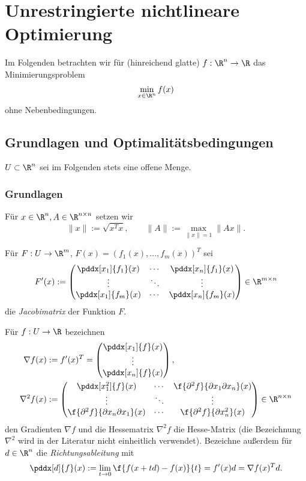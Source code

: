 \chapter{Unrestringierte nichtlineare Optimierung}


Im Folgenden betrachten wir für (hinreichend glatte) $f: \R^n \to \R$ das Minimierungsproblem
\[
	\min_{x\in \R^n} f(x)
\]
ohne Nebenbedingungen.


\section{Grundlagen und Optimalitätsbedingungen}


$U \subset \R^n$ sei im Folgenden stets eine offene Menge.


\subsection{Grundlagen}

Für $x \in \R^n, A \in \R^{n\times n}$ setzen wir
\[
	\|x\| := \sqrt{x^T x}, \qquad
	\|A\| := \max_{\|x\|=1} \|Ax\|.
\]

Für $F: U \to \R^m$, $F(x) = (f_1(x), \dotsc, f_m(x))^T$ sei
\[
	F'(x) := \begin{pmatrix}
		\pddx[x_1]{f_1}(x) & \cdots & \pddx[x_n]{f_1}(x) \\
		\vdots & \ddots & \vdots \\
		\pddx[x_1]{f_m}(x) & \cdots & \pddx[x_n]{f_m}(x) \\
	\end{pmatrix} \in \R^{m\times n}
\]
die \emph{Jacobimatrix} der Funktion $F$.

Für $f: U \to \R$ bezeichnen
\begin{align*}
	\nabla f(x)
	&:= f'(x)^T
	= \begin{pmatrix}
		\pddx[x_1]{f}(x) \\
		\vdots \\
		\pddx[x_n]{f}(x) \\
	\end{pmatrix}, \\
	\nabla^2 f(x)
	&:= \begin{pmatrix}
		\pddx[x_1^2]{f}(x) & \cdots & \f{\partial^2 f}{\partial x_1 \partial x_n}(x) \\
		\vdots & \ddots & \vdots \\
		\f{\partial^2 f}{\partial x_n \partial x_1}(x) & \cdots & \f{\partial^2 f}{\partial x_n^2}(x) \\
	\end{pmatrix} \in \R^{n\times n}
\end{align*}
den Gradienten $\nabla f$ und die Hessematrix $\nabla^2 f$ die Hesse-Matrix
(die Bezeichnung $\nabla^2$ wird in der Literatur nicht einheitlich verwendet).
Bezeichne außerdem für $d \in \R^n$ die \emph{Richtungsableitung} mit
\[
	\pddx[d]{f}(x)
	:= \lim_{t\to 0} \f {f(x+td) - f(x)}{t}
	= f'(x) d = \nabla f(x)^T d.
\]

